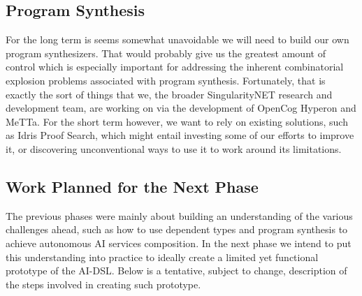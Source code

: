 \documentclass[]{report}
\begin{document}
\subsection{Program Synthesis}

For the long term is seems somewhat unavoidable we will need to build
our own program synthesizers.  That would probably give us the
greatest amount of control which is especially important for
addressing the inherent combinatorial explosion problems associated
with program synthesis.  Fortunately, that is exactly the sort of
things that we, the broader SingularityNET research and development
team, are working on via the development of OpenCog Hyperon and MeTTa.
For the short term however, we want to rely on existing solutions,
such as Idris Proof Search, which might entail investing some of our
efforts to improve it, or discovering unconventional ways to use it to
work around its limitations.

\subsection{Work Planned for the Next Phase}

The previous phases were mainly about building an understanding of the
various challenges ahead, such as how to use dependent types and
program synthesis to achieve autonomous AI services composition.  In
the next phase we intend to put this understanding into practice to
ideally create a limited yet functional prototype of the AI-DSL.
Below is a tentative, subject to change, description of the steps
involved in creating such prototype.
\end{document}

